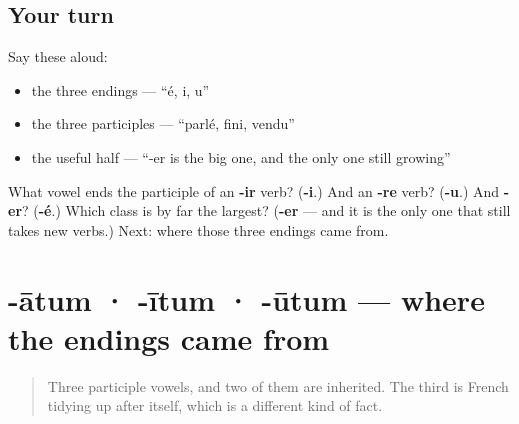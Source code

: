\subsection*{Your turn}
Say these aloud:

\begin{itemize}
\raggedright
  \item the three endings — \textquotedblleft{}é, i, u\textquotedblright{}
  \item the three participles — \textquotedblleft{}parlé, fini, vendu\textquotedblright{}
  \item the useful half — \textquotedblleft{}-er is the big one, and the only one still growing\textquotedblright{}
\end{itemize}

\begin{tcolorbox}[breakable,colback=teal!4,colframe=teal!35!black,title={Before you move on}]
What vowel ends the participle of an \textbf{-ir} verb? (\textbf{-i}.) And an \textbf{-re} verb? (\textbf{-u}.) And \textbf{-er}? (\textbf{-é}.) Which class is by far the largest? (\textbf{-er} — and it is the only one that still takes new verbs.) Next: where those three endings came from.
\end{tcolorbox}
\section[-ātum · -ītum · -ūtum]{-ātum · -ītum · -ūtum — where the endings came from}

\label{lesson:FR-C15-participe-latin}



\begin{quote}
Three participle vowels, and two of them are inherited. The third is French tidying up after itself, which is a different kind of fact.
\end{quote}

